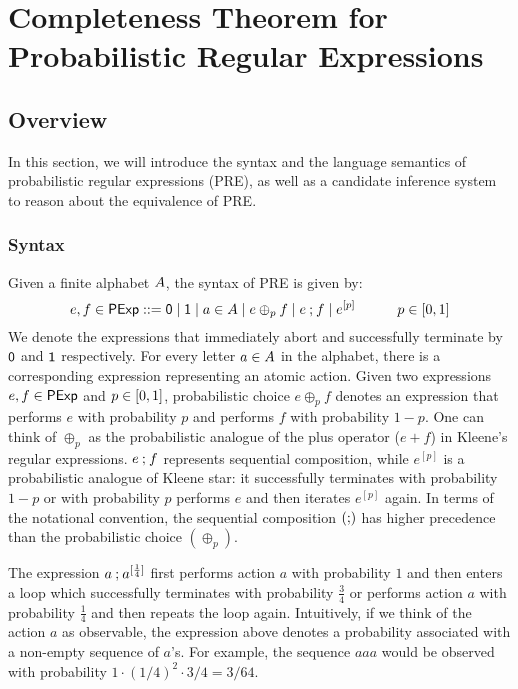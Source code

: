 \chapter{Completeness Theorem for Probabilistic Regular Expressions}
\label{chapter4}
\section{Overview}
In this section, we will introduce the syntax and the language semantics of probabilistic regular expressions ({PRE}), as well as a candidate inference system to reason about the equivalence of {PRE}. 

\subsection{Syntax}
Given a finite alphabet ${A}$, the syntax of {PRE} is given by:
$$e,f \in \PExp ::= \zero \mid \one \mid a \in A \mid e \oplus_p f \mid e\seq f \mid e^{[p]} \quad\quad\quad p \in\interval{0}{1}$$
We denote the expressions that immediately abort and successfully terminate by $\mathsf{0}$ and $\mathsf{1}$ respectively. For every letter $a \in {A}$ in the alphabet, there is a corresponding expression representing an atomic action. Given two expressions $e, f \in {\mathsf{PExp}}$ and $p \in \interval{0}{1}$, probabilistic choice $e \oplus_p f$ denotes an expression that performs $e$ with probability $p$ and performs $f$ with probability $1-p$. One can think of $ \oplus_p$ as the probabilistic analogue of the
 plus operator ($e + f$) in Kleene's regular expressions. $e \mathbin{;} f$ represents sequential composition, while $e^{[p]}$ is a probabilistic analogue of Kleene star: it successfully terminates with probability $1-p$ or with probability $p$ performs $e$ and then iterates $e^{[p]}$ again.  In terms of the notational convention, the sequential composition $(\mathbin{;})$ has higher precedence than the probabilistic choice $(\oplus_p)$.

\begin{example}
    The expression $a \mathbin{;} a^{[\frac{1}{4}]}$ first performs action $a$ with probability $1$ and then enters a loop which successfully terminates with probability $\frac{3}{4}$ or performs action $a$ with probability $\frac{1}{4}$ and then repeats the loop again. Intuitively, if we think of the action $a$ as observable, the expression above denotes a probability associated with a non-empty sequence of $a$'s. For example, the sequence $aaa$ would be observed with probability $1 \cdot (1/4)^2 \cdot 3/4=3/64$.
\end{example}
